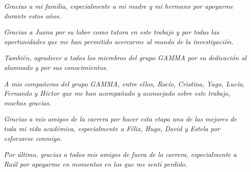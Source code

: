 \thispagestyle{abstract}
\begin{flushright}
    \vspace*{5cm}
    \medskip
    \textit{Gracias a mi familia, especialmente a mi madre y mi hermano por apoyarme durante estos años.}

    \vspace{1\baselineskip}

    \textit{Gracias a Juana por su labor como tutora en este trabajo y por todas las oportunidades que me han permitido acercarme al mundo de la investigación.}

    \vspace{1\baselineskip}

    \textit{También, agradecer a todos los miembros del grupo GAMMA por su dedicación al alumnado y por sus conocimientos.}

    \vspace{1\baselineskip}

    \textit{A mis compañeros del grupo GAMMA, entre ellos, Rocío, Cristina, Yago, Lucía, Fernando y Héctor que me han acompañado y aconsejado sobre este trabajo, muchas gracias.}

    \vspace{1\baselineskip}

    \textit{Gracias a mis amigos de la carrera por hacer esta etapa una de las mejores de toda mi vida académica, especialmente a Félix, Hugo, David y Estela por esforzarse conmigo.}

    \vspace{1\baselineskip}

    \textit{Por último, gracias a todos mis amigos de fuera de la carrera, especialmente a Raúl por apoyarme en momentos en los que me sentí perdido.}

\end{flushright}


